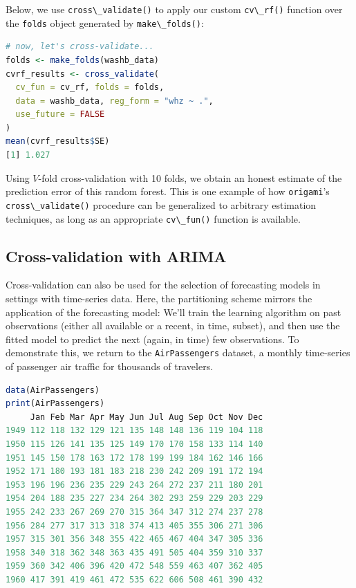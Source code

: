 \documentclass[
  12pt, krantz2,
]{krantz}
\newcommand{\passthrough}[1]{#1}
\newcommand{\1}{\mathbbm{1}}
\theoremstyle{definition}
\theoremstyle{definition}
\theoremstyle{definition}
\theoremstyle{definition}
\theoremstyle{remark}
\begin{document}
Below, we use \passthrough{\lstinline!cross\_validate()!} to apply our custom \passthrough{\lstinline!cv\_rf()!} function over the
\passthrough{\lstinline!folds!} object generated by \passthrough{\lstinline!make\_folds()!}:

\begin{lstlisting}[language=R]
# now, let's cross-validate...
folds <- make_folds(washb_data)
cvrf_results <- cross_validate(
  cv_fun = cv_rf, folds = folds,
  data = washb_data, reg_form = "whz ~ .",
  use_future = FALSE
)
mean(cvrf_results$SE)
[1] 1.027
\end{lstlisting}

Using \(V\)-fold cross-validation with 10 folds, we obtain an honest estimate of
the prediction error of this random forest. This is one example of how
\passthrough{\lstinline!origami!}'s \passthrough{\lstinline!cross\_validate()!} procedure can be generalized to arbitrary
estimation techniques, as long as an appropriate \passthrough{\lstinline!cv\_fun()!} function is
available.

\hypertarget{cross-validation-with-arima}{%
\subsection{Cross-validation with ARIMA}\label{cross-validation-with-arima}}

Cross-validation can also be used for the selection of forecasting models in
settings with time-series data. Here, the partitioning scheme mirrors the
application of the forecasting model: We'll train the learning algorithm on past
observations (either all available or a recent, in time, subset), and then use
the fitted model to predict the next (again, in time) few observations. To
demonstrate this, we return to the \passthrough{\lstinline!AirPassengers!} dataset, a monthly
time-series of passenger air traffic for thousands of travelers.

\begin{lstlisting}[language=R]
data(AirPassengers)
print(AirPassengers)
     Jan Feb Mar Apr May Jun Jul Aug Sep Oct Nov Dec
1949 112 118 132 129 121 135 148 148 136 119 104 118
1950 115 126 141 135 125 149 170 170 158 133 114 140
1951 145 150 178 163 172 178 199 199 184 162 146 166
1952 171 180 193 181 183 218 230 242 209 191 172 194
1953 196 196 236 235 229 243 264 272 237 211 180 201
1954 204 188 235 227 234 264 302 293 259 229 203 229
1955 242 233 267 269 270 315 364 347 312 274 237 278
1956 284 277 317 313 318 374 413 405 355 306 271 306
1957 315 301 356 348 355 422 465 467 404 347 305 336
1958 340 318 362 348 363 435 491 505 404 359 310 337
1959 360 342 406 396 420 472 548 559 463 407 362 405
1960 417 391 419 461 472 535 622 606 508 461 390 432
\end{lstlisting}
\end{document}

